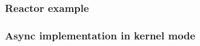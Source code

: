 \begin{frame}[fragile]
    \frametitle{Reactor example}
% 
% 
% 
\end{frame}
\begin{frame}[fragile]
    \frametitle{Async implementation in kernel mode}
% 
% 
% 
% 
% 
% 
% 
% 
\end{frame}
